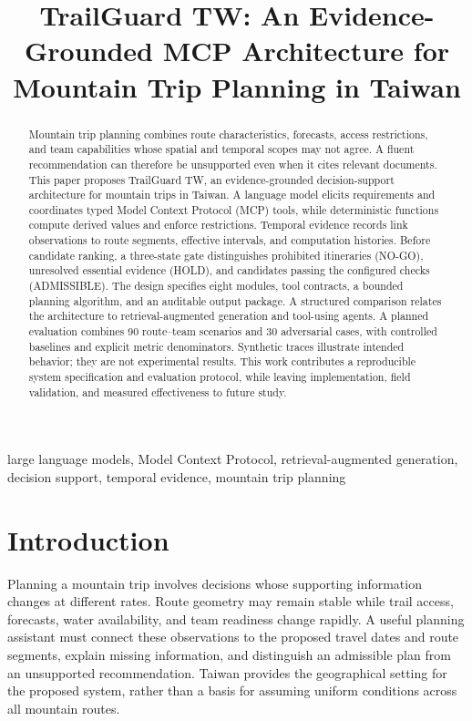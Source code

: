 \documentclass[conference]{IEEEtran}
\begin{document}
\title{TrailGuard TW: An Evidence-Grounded MCP Architecture for Mountain Trip Planning in Taiwan}
\author{
}
\maketitle
\begin{abstract}
Mountain trip planning combines route characteristics, forecasts, access restrictions, and team capabilities whose spatial and temporal scopes may not agree. A fluent recommendation can therefore be unsupported even when it cites relevant documents. This paper proposes TrailGuard TW, an evidence-grounded decision-support architecture for mountain trips in Taiwan. A language model elicits requirements and coordinates typed Model Context Protocol (MCP) tools, while deterministic functions compute derived values and enforce restrictions. Temporal evidence records link observations to route segments, effective intervals, and computation histories. Before candidate ranking, a three-state gate distinguishes prohibited itineraries (NO-GO), unresolved essential evidence (HOLD), and candidates passing the configured checks (ADMISSIBLE). The design specifies eight modules, tool contracts, a bounded planning algorithm, and an auditable output package. A structured comparison relates the architecture to retrieval-augmented generation and tool-using agents. A planned evaluation combines 90 route--team scenarios and 30 adversarial cases, with controlled baselines and explicit metric denominators. Synthetic traces illustrate intended behavior; they are not experimental results. This work contributes a reproducible system specification and evaluation protocol, while leaving implementation, field validation, and measured effectiveness to future study.
\end{abstract}
\begin{IEEEkeywords}
large language models, Model Context Protocol, retrieval-augmented generation, decision support, temporal evidence, mountain trip planning
\end{IEEEkeywords}

\section{Introduction}
Planning a mountain trip involves decisions whose supporting information changes at different rates. Route geometry may remain stable while trail access, forecasts, water availability, and team readiness change rapidly. A useful planning assistant must connect these observations to the proposed travel dates and route segments, explain missing information, and distinguish an admissible plan from an unsupported recommendation. Taiwan provides the geographical setting for the proposed system, rather than a basis for assuming uniform conditions across all mountain routes.
\end{document}
